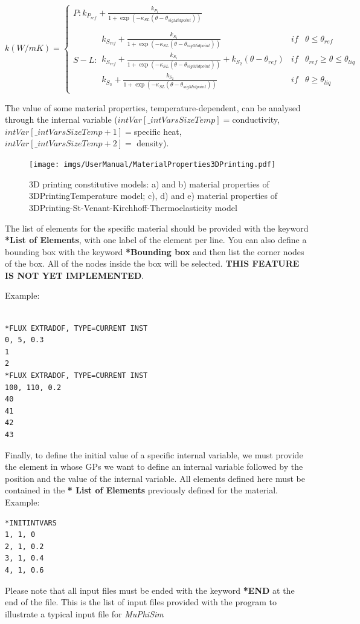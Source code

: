 \documentclass[oneside,11pt,times]{book}
\begin{document}
\begin{enumerate}
    \begin{equation*}
    k (W/mK)=\left\{ \begin{array}{lcc} P:
    k_{P_{ref}} + \frac{k_{P_1}}{1 +\exp(-\kappa_{SL} (\theta -\theta_{sigMidpoint}))}  \\ \\
    S-L: \begin{array}{lcc}
    k_{S_{ref}}+ \frac{k_{S_1}}{1 +\exp(-\kappa_{SL} (\theta -\theta_{sigMidpoint}))} & if & \theta\leq \theta_{ref}\\
    k_{S_{ref}}+ \frac{k_{S_1}}{1 +\exp(-\kappa_{SL} (\theta -\theta_{sigMidpoint}))} + k_{S_2} (\theta - \theta_{ref})  & if & \theta_{ref}\geq \theta\leq\theta_{liq}\\
    k_{S_3}+ \frac{k_{S_2}}{1 +\exp(-\kappa_{SL} (\theta -\theta_{sigMidpoint}))} & if & \theta\geq \theta_{liq}
    \end{array}
    \end{array}
    \right.
    \end{equation*}

    The  value of some material properties, temperature-dependent, can be analysed through the internal variable ($intVar[\_intVarsSizeTemp]=$conductivity, $intVar[\_intVarsSizeTemp+1]=$specific heat, $intVar[\_intVarsSizeTemp+2]=$ density).
    
    \begin{figure}[H]
    \centering
    \texttt{[image: imgs/UserManual/MaterialProperties3DPrinting.pdf]}
    \caption{3D printing constitutive models: a) and b) material properties of 3DPrintingTemperature model; c), d) and e) material properties of 3DPrinting-St-Venant-Kirchhoff-Thermoelasticity model}
    \label{fig:3D-printingModels}
\end{figure}
\end{enumerate}


The list of elements for the specific material should be provided with the keyword  \textbf{*List of Elements}, with one label of the element per line. You can also define a bounding box with the keyword \textbf{*Bounding box} and then list the corner nodes of the box. All of the nodes inside the box will be selected. \textbf{THIS FEATURE IS NOT YET IMPLEMENTED}.

Example:
\begin{lstlisting}

*FLUX EXTRADOF, TYPE=CURRENT INST
0, 5, 0.3
1
2
*FLUX EXTRADOF, TYPE=CURRENT INST
100, 110, 0.2
40
41
42
43
\end{lstlisting}
Finally, to define the initial value of a specific internal variable, we must provide the element in whose GPs we want to define an internal variable followed by the position and the value of the internal variable. All elements defined here must be contained in the \textbf {* List of Elements} previously defined for the material.
Example:
\begin{lstlisting}
*INITINTVARS
1, 1, 0
2, 1, 0.2
3, 1, 0.4
4, 1, 0.6
\end{lstlisting}
Please note that all input files must be ended with the keyword \textbf{*END} at the end of the file. This is the list of input files provided with the program to illustrate a typical input file for \textit{MuPhiSim}
\end{document}
